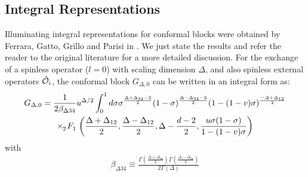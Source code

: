% 
%   

  \subsection{Integral Representations}
  Illuminating integral representations for conformal blocks were obtained by Ferrara, Gatto, Grillo and Parisi in \cite{Ferrara:1,Ferrara:2,Ferrara:3}. We just state the results and refer the reader to the original literature for a more detailed discussion. For the exchange of a spinless operator ($l=0$) with scaling dimension $\Delta$, and also spinless external operators $\hat{\mathcal{{O}}}_i$, the conformal block $G_{\Delta,0}$ can be written in an integral form as:
  \begin{multline}
   G_{\Delta,0}=\frac{1}{2\beta_{\Delta 34}} u^{\Delta/2} \int_0^1 d \sigma \sigma^{\frac{\Delta + \Delta_{34}-2}{2}} (1-\sigma)^{\frac{\Delta - \Delta_{34}-2}{2}} (1-(1-v)\sigma)^{\frac{-\Delta + \Delta_{12}}{2}} \\ \times \tensor[_2]{F}{_1}\left(\frac{\Delta+\Delta_{12}}{2},\frac{\Delta-\Delta_{12}}{2},\Delta-\frac{d-2}{2},\frac{u\sigma(1-\sigma)}{1-(1-v)\sigma} \right)
  \end{multline}
  with
  \begin{align}
   \beta_{\Delta 34} \equiv \frac{\Gamma\left(\frac{\Delta+\Delta_{34}}{2} \right) \Gamma\left( \frac{\Delta-\Delta_{34}}{2}\right)}{2\Gamma(\Delta)}
  \end{align}

